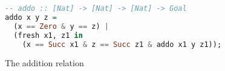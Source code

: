 \begin{figure}[h!]
  \begin{lstlisting}[language=Haskell, basicstyle=\small]
-- addo :: [Nat] -> [Nat] -> [Nat] -> Goal 
addo x y z = 
  (x == Zero & y == z) | 
  (fresh x1, z1 in 
    (x == Succ x1 & z == Succ z1 & addo x1 y z1));
  \end{lstlisting}
  \caption{The addition relation}
  \label{fig:background:addo}
\end{figure}